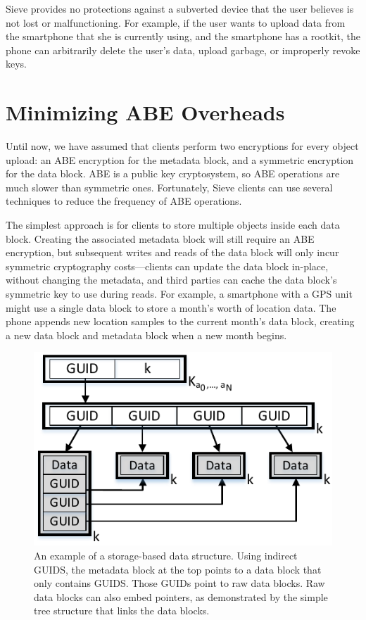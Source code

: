Sieve provides no protections against a subverted
device that the user believes is not lost or
malfunctioning. For example, if the user wants
to upload data from the smartphone that she
is currently using, and the smartphone has a
rootkit, the phone can arbitrarily delete the
user's data, upload garbage, or improperly
revoke keys.

\section{Minimizing ABE Overheads}
\label{sec:minAbeCost}

Until now, we have assumed that clients
perform two encryptions for every object
upload: an ABE encryption for the metadata
block, and a symmetric encryption for
the data block. ABE is a public key
cryptosystem, so ABE operations are
much slower than symmetric
ones. Fortunately, Sieve clients can use
several techniques to reduce the frequency
of ABE operations.

The simplest approach is for clients to
store multiple objects inside each data block.
Creating the associated metadata block
will still require an ABE encryption,
but subsequent writes and reads of the data
block will only incur symmetric cryptography
costs---clients can update the data block
in-place, without changing the metadata,
and third parties can cache the data block's
symmetric key to use during reads. For
example, a smartphone with a GPS unit might
use a single data block to store a month's
worth of location data. The phone appends
new location samples to the current month's
data block, creating a new data block and
metadata block when a new month begins.

\begin{figure}
  \centering
     \includegraphics{figs/guidMap2.pdf}
     \caption[Example of Sieve storage-based data structure]
     {An example of a storage-based data structure. 
              Using indirect GUIDS, the metadata block at the top
              points to a data block that only contains GUIDS.
              Those GUIDs point to raw data blocks. Raw data blocks
              can also embed pointers, as demonstrated by the simple
              tree structure that links the data blocks.}
  \label{fig:guidMap}
\end{figure}

